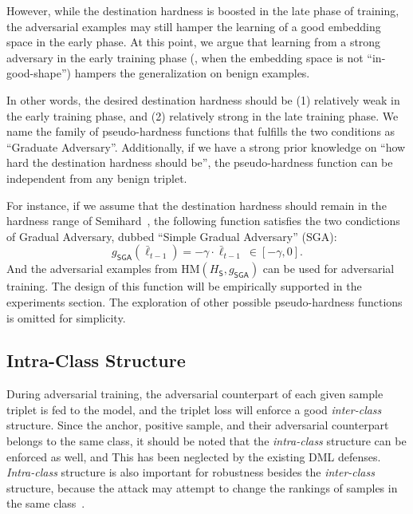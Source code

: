 \documentclass[10pt,twocolumn,letterpaper]{article}
\begin{document}

However, while the destination hardness is boosted in the late phase of
training, the adversarial examples may still hamper the learning of a good
embedding space in the early phase.
%
At this point, we argue that learning from a strong adversary in the early
training phase (\ie, when the embedding space is not ``in-good-shape'') hampers the
generalization on benign examples.


In other words, the desired destination hardness should be (1) relatively weak
in the early training phase, and (2) relatively strong in the late training
phase.
%
We name the family of pseudo-hardness functions that fulfills the two
conditions as ``Graduate Adversary''.
%
Additionally, if we have a strong prior knowledge on ``how hard the destination
hardness should be'', the pseudo-hardness function can be independent from
any benign triplet.


For instance, if we assume that the destination hardness should remain
in the hardness range of Semihard~\cite{facenet}, the following function
satisfies the two condictions of Gradual Adversary, dubbed
``Simple Gradual Adversary'' (SGA):
%
\begin{equation}
	g_\mathsf{SGA}(\bar{\ell}_{t-1}) =
	-\gamma \cdot \bar{\ell}_{t-1} ~ \in [-\gamma,0].
\end{equation}
%
And the adversarial examples from $\text{HM}(H_\mathsf{S},g_\mathsf{SGA})$
can be used for adversarial training.
%
The design of this function will be empirically supported in the experiments
section.
%
The exploration of other possible pseudo-hardness functions is omitted 
for simplicity.

\subsection{Intra-Class Structure}
\label{sec:33}


During adversarial training, the adversarial counterpart of each given sample
triplet is fed to the model, and the triplet loss will enforce a good
\emph{inter-class} structure.
%
Since the anchor, positive sample, and their adversarial counterpart belongs to
the same class, it should be noted that the \emph{intra-class} structure can be
enforced as well, and This has been neglected by the existing DML defenses.
%
\emph{Intra-class} structure is also important for robustness besides the
\emph{inter-class} structure, because the attack may attempt to change the
rankings of samples in the same class~\cite{advrank}.
\end{document}
